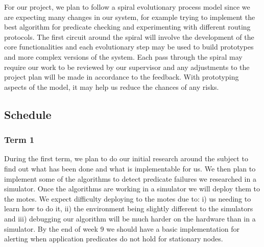 \documentclass[a4paper]{article}
\begin{document}
For our project, we plan to follow a spiral evolutionary process model since we
are expecting many changes in our system, for example trying to implement the
best algorithm for predicate checking and experimenting with different routing
protocols. The first circuit around the spiral will involve the development of
the core functionalities and each evolutionary step may be used to build
prototypes and more complex versions of the system. Each pass through the spiral
may require our work to be reviewed by our supervisor and any adjustments to the
project plan will be made in accordance to the feedback. With prototyping
aspects of the model, it may help us reduce the chances of any risks.



\subsection{Schedule}

\subsubsection{Term 1}

During the first term, we plan to do our initial research around the subject to
find out what has been done and what is implementable for us. We then plan to
implement some of the algorithms to detect predicate failures we researched in a
simulator. Once the algorithms are working in a simulator we will deploy them to
the motes. We expect difficulty deploying to the motes due to: i) us needing to
learn how to do it, ii) the environment being slightly different to the
simulators and iii) debugging our algorithm will be much harder on the hardware
than in a simulator. By the end of week 9 we should have a basic implementation
for alerting when application predicates do not hold for stationary nodes.
\end{document}

